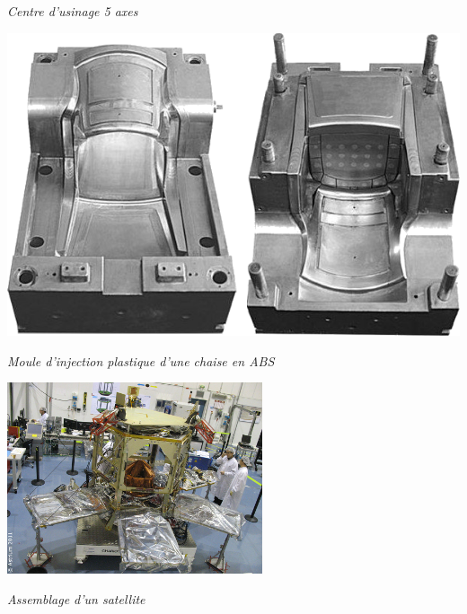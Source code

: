 \documentclass[11pt,oneside]{article}
\begin{document}
\begin{exemple}
\begin{minipage}[c]{.22\linewidth}
\begin{center}
\textit{Centre d'usinage 5 axes}\cite{u5x}
\end{center}
\end{minipage}
\hfill
\begin{minipage}[c]{.22\linewidth}
\begin{center}
\includegraphics[width=.95\textwidth]{png/injection}

\textit{Moule d'injection plastique d'une chaise en ABS}\cite{injection}
\end{center}
\end{minipage}
\hfill
\begin{minipage}[c]{.22\linewidth}
\begin{center}
\includegraphics[width=.95\textwidth]{png/satellite_p}

\textit{Assemblage d'un satellite}\cite{satellite}
\end{center}
\end{minipage}

\end{exemple}
\end{document}

